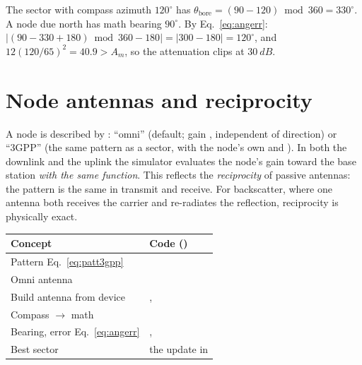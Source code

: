 \begin{example}
The sector with compass azimuth $120^\circ$ has $\theta_{\mathrm{bore}}=(90-120)\bmod360=330^\circ$.
A node due north has math bearing $90^\circ$. By Eq.~\eqref{eq:angerr}:
$\left|(90-330+180)\bmod 360-180\right|=\left|300-180\right|=120^\circ$, and
$12(120/65)^2=40.9>A_m$, so the attenuation clips at $\SI{30}{dB}$.
\end{example}

\section{Node antennas and reciprocity}

A node is described by : ``omni'' (default; gain
, independent of direction) or ``3GPP'' (the same pattern as a
sector, with the node's own  and ).
In both the downlink and the uplink the simulator evaluates the node's gain
toward the base station \emph{with the same function}. This reflects the
\emph{reciprocity} of passive antennas: the pattern is the same in transmit and
receive. For backscatter, where one antenna both receives the carrier and
re-radiates the reflection, reciprocity is physically exact.

\begin{codemap}
\small
\begin{tabularx}{\linewidth}{@{}>{\ttfamily}p{5.0cm}X@{}}
\toprule
\normalfont\bfseries Concept & \normalfont\bfseries Code (\file{amber/propagation.py})\\
\midrule
Pattern Eq.~\eqref{eq:patt3gpp} & \codew{SectorAntenna3GPP.gain_linear}\\
Omni antenna & \codew{OmniAntenna.gain_linear}\\
Build antenna from device & \codew{antenna_from_sector}, \codew{antenna_from_node}\\
Compass $\to$ math & \codew{compass_to_math}\\
Bearing, error Eq.~\eqref{eq:angerr} & \code{bearing_deg}, \codew{angular_error_deg}\\
Best sector & the \codew{mask = p_w > best_pw_w} update in \codew{compute_bs_to_point}\\
\bottomrule
\end{tabularx}
\end{codemap}

